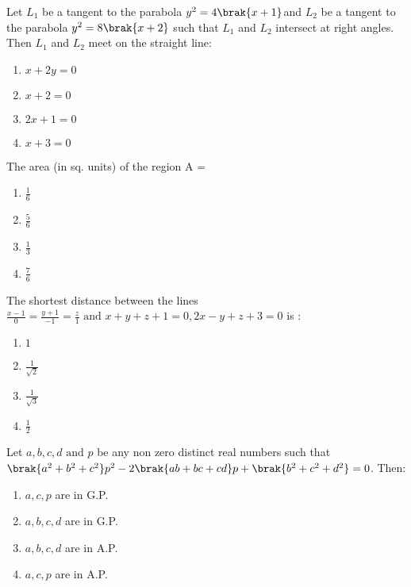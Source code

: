 \item  Let $L_1$ be a tangent to the parabola $y^2 = 4 \brak{x+1}$and $L_2$ be a tangent to the parabola $y^2 = 8\brak{x+2}$ such that $L_1$ and $L_2$ intersect at right angles. Then $L_1$ and $L_2$ meet on the straight line:\hfill{}


\begin{multicols}{4}
\begin{enumerate}
\item $x+2y = 0$
\item $ x+2 = 0$
\item $ 2x+1 = 0$
\item $x+3 = 0$
\end{enumerate}
\end{multicols}

\item  The area (in sq. units) of the region A = 

\hfill{}



\begin{multicols}{4}
\begin{enumerate}
\item $\frac{1}{6}$
\item $\frac{5}{6}$
\item $\frac{1}{3}$
\item $\frac{7}{6}$
\end{enumerate}
\end{multicols}

\item  The shortest distance between the lines $\frac{x - 1}{0} = \frac{y + 1}{-1} = \frac{z}{1} \text{ and } x+y+z+1 = 0, 2x-y+z+3 = 0$ is :\hfill{}

\begin{multicols}{4}
\begin{enumerate}
\item $1$
\item $\frac{1}{\sqrt{2}}$
\item $\frac{1}{\sqrt{3}}$
\item $\frac{1}{2}$
\end{enumerate}
\end{multicols}

\item  Let $a, b, c, d \text{ and } p$ be any non zero distinct real numbers such that $\brak{a^2+b^2+c^2}p^2-2\brak{ab+bc+cd}p +\brak{b^2 +c^2+d^2} = 0$. Then:\hfill{}
\begin{multicols}{2}
\begin{enumerate}
\item $a, c, p$ are in G.P.
\item $a, b, c, d$ are in G.P.
\item $ a, b, c, d$ are in A.P.
\item $a, c, p$ are in A.P.
\end{enumerate}
\end{multicols}

